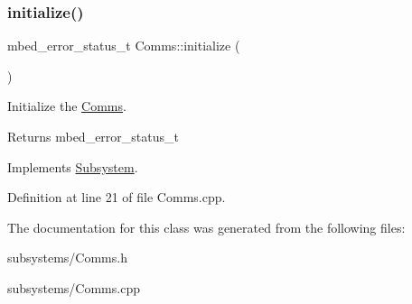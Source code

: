 \subsubsection{\texorpdfstring{initialize()}{initialize()}}
{\footnotesize\ttfamily mbed\+\_\+error\+\_\+status\+\_\+t Comms\+::initialize (\begin{DoxyParamCaption}{ }\end{DoxyParamCaption})\hspace{0.3cm}{\ttfamily [virtual]}}



Initialize the \mbox{\hyperlink{class_comms}{Comms}}. 

\begin{DoxyReturn}{Returns}
mbed\+\_\+error\+\_\+status\+\_\+t 
\end{DoxyReturn}


Implements \mbox{\hyperlink{class_subsystem_afa43e7c1c8b49e514b944f517d4dc905}{Subsystem}}.



Definition at line 21 of file Comms.\+cpp.



The documentation for this class was generated from the following files\+:\begin{DoxyCompactItemize}
\item 
subsystems/Comms.\+h\item 
subsystems/Comms.\+cpp\end{DoxyCompactItemize}
